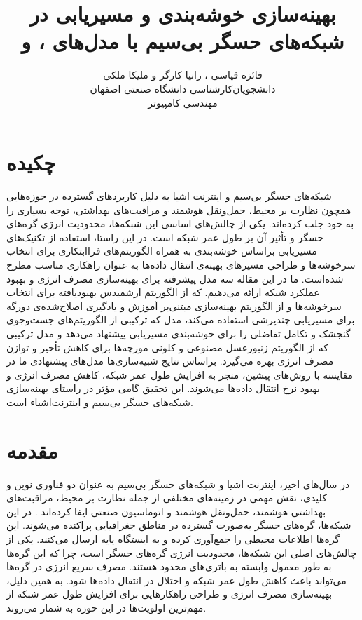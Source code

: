 \documentclass[11.5pt,onecolumn,a4paper]{article}
\begin{document}
	
	
	\title{بهینه‌سازی خوشه‌بندی و مسیر‌یابی در شبکه‌های حسگر بی‌سیم با مدل‌های ،  و } 
	\author{فائزه قیاسی ، رانیا کارگر و ملیکا ملکی\\
		دانشجویان‌کارشناسی دانشگاه صنعتی اصفهان\\
		مهندسی کامپیوتر}
	\date{}
	\maketitle
	\thispagestyle{empty}
	\section*{چکیده}
	شبکه‌های حسگر بی‌سیم و اینترنت‌ اشیا به دلیل کاربردهای گسترده در حوزه‌هایی همچون نظارت بر محیط، حمل‌ونقل هوشمند و مراقبت‌های بهداشتی، توجه بسیاری را به خود جلب کرده‌اند. یکی از چالش‌های اساسی این شبکه‌ها، محدودیت انرژی گره‌های حسگر و تأثیر آن بر طول عمر شبکه است. در این راستا، استفاده از تکنیک‌های مسیریابی براساس خوشه‌بندی به‌ همراه الگوریتم‌های فراابتکاری برای انتخاب سرخوشه‌ها و طراحی مسیرهای بهینه‌ی انتقال داده‌ها به عنوان راهکاری مناسب مطرح شده‌است. ما در این مقاله سه مدل پیشرفته برای بهینه‌سازی مصرف انرژی و بهبود عملکرد شبکه ارائه می‌دهیم.  که از الگوریتم ارشمیدس بهبودیافته برای انتخاب سرخوشه‌ها و از الگوریتم بهینه‌سازی مبتنی‌بر آموزش و یادگیری اصلاح‌شده‌ی دورگه برای مسیریابی چندپرشی استفاده می‌کند، مدل  که ترکیبی از الگوریتم‌های جست‌وجوی گنجشک و تکامل تفاضلی را برای خوشه‌بندی مسیریابی پیشنهاد می‌دهد و مدل ترکیبی  که از الگوریتم زنبورعسل مصنوعی و کلونی مورچه‌ها برای کاهش تأخیر و توازن مصرف انرژی بهره می‌گیرد. براساس نتایج شبیه‌سازی‌ها مدل‌های پیشنهادی ما در مقایسه با روش‌های پیشین، منجر به افزایش طول عمر شبکه، کاهش مصرف انرژی و بهبود نرخ انتقال داده‌ها می‌شوند. این تحقیق گامی مؤثر در راستای بهینه‌سازی شبکه‌های حسگر بی‌سیم و اینترنت‌اشیاء است.
	\clearpage
	\newpage
	\section*{مقدمه}
	\hspace*{1em}در سال‌های اخیر، اینترنت اشیا  و شبکه‌های حسگر بی‌سیم به عنوان دو فناوری نوین و کلیدی، نقش مهمی در زمینه‌های مختلفی از جمله نظارت بر محیط، مراقبت‌های بهداشتی هوشمند، حمل‌ونقل هوشمند و اتوماسیون صنعتی ایفا کرده‌اند \cite{ref1, ref2, ref3}. در این شبکه‌ها، گره‌های حسگر به‌صورت گسترده در مناطق جغرافیایی پراکنده می‌شوند. این گره‌ها اطلاعات محیطی را جمع‌آوری کرده و به ایستگاه‌ پایه ارسال می‌کنند. یکی از چالش‌های اصلی این شبکه‌ها، محدودیت انرژی گره‌های حسگر است، چرا که این گره‌ها به طور معمول وابسته به باتری‌های محدود هستند. مصرف سریع انرژی در گره‌ها می‌تواند باعث کاهش طول عمر شبکه و اختلال در انتقال داده‌ها شود. به همین دلیل، بهینه‌سازی مصرف انرژی و طراحی راهکارهایی برای افزایش طول عمر شبکه از مهم‌ترین اولویت‌ها در این حوزه به‌ شمار می‌روند.
	
\end{document}
